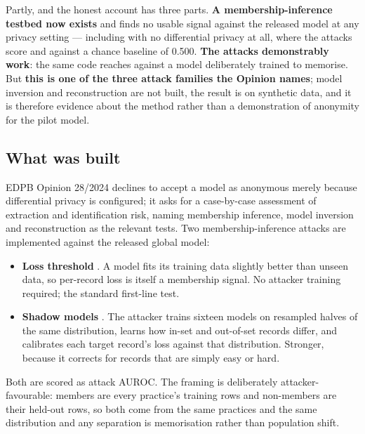\label{sec:anontest}
\statusMeasured

\begin{shortanswer}
Partly, and the honest account has three parts. \textbf{A membership-inference testbed now exists}
and finds no usable signal against the released model at any privacy setting --- including with no
differential privacy at all, where the attacks score \MIANoDPThreshold{} and \MIANoDPShadow{} against
a chance baseline of 0.500. \textbf{The attacks demonstrably work}: the same code reaches
\MIAControlShadow{} against a model deliberately trained to memorise. But \textbf{this is one of the
three attack families the Opinion names}; model inversion and reconstruction are not built, the
result is on synthetic data, and it is therefore evidence about the method rather than a
demonstration of anonymity for the pilot model.
\end{shortanswer}

\subsection{What was built}

EDPB Opinion 28/2024 \cite{edpb2024ai} declines to accept a model as anonymous merely because
differential privacy is configured; it asks for a case-by-case assessment of extraction and
identification risk, naming membership inference, model inversion and reconstruction as the relevant
tests. Two membership-inference attacks are implemented against the released global model:

\begin{itemize}
  \item \textbf{Loss threshold} \cite{yeom2018privacy}. A model fits its training data slightly
        better than unseen data, so per-record loss is itself a membership signal. No attacker
        training required; the standard first-line test.
  \item \textbf{Shadow models} \cite{shokri2017membership}. The attacker trains sixteen models on
        resampled halves of the same distribution, learns how in-set and out-of-set records differ,
        and calibrates each target record's loss against that distribution. Stronger, because it
        corrects for records that are simply easy or hard.
\end{itemize}

Both are scored as attack AUROC. The framing is deliberately attacker-favourable: members are every
practice's training rows and non-members are their held-out rows, so both come from the same
practices and the same distribution and any separation is memorisation rather than population shift.

